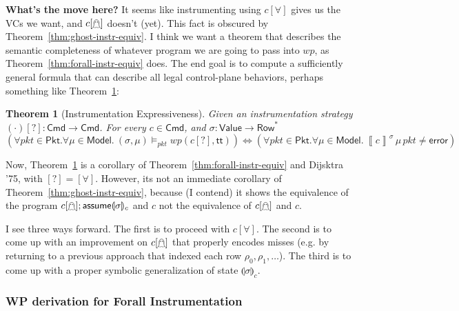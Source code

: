 \documentclass{article}
\newcommand{\pkt}{\mathit{pkt}}
\newcommand{\error}{\mathsf{error}}
\newcommand{\denote}[1]{\left\llbracket#1\right\rrbracket}
\newcommand{\TRUE}{\mathsf{tt}}
\newcommand{\Value}{\mathsf{Value}}
\newcommand{\Cmd}{\mathsf{Cmd}}
\newcommand{\Pkt}{\mathsf{Pkt}}
\newcommand{\Model}{\mathsf{Model}}
\newcommand{\Row}{\mathsf{Row}}
\newcommand{\assume}{\mathop{\mathsf{assume}}}
\newcommand{\WP}{\textit{wp}}
\newcommand{\satisfy}[3]{({#1,#3}) \models_{#2}}
\newcommand{\state}[1]{\llparenthesis#1\rrparenthesis}
\newcommand{\instr}{[\forall]}
\newcommand{\ginstr}{[\mathghost]}
\newtheorem{theorem}{Theorem}
\begin{document}
\textbf{What's the move here?} It seems like instrumenting using $c\instr$ gives
us the VCs we want, and $c\ginstr$ doesn't (yet). This fact is obscured by
Theorem~\ref{thm:ghost-instr-equiv}. I think we want a theorem that describes
the semantic completeness of whatever program we are going to pass into $\WP$,
as Theorem~\ref{thm:forall-instr-equiv} does. The end goal is to compute a sufficiently general formula that can describe all legal control-plane behaviors, perhaps something like Theorem~\ref{thm:instr-expressiveness}:

\begin{theorem}[Instrumentation Expressiveness]
  \label{thm:instr-expressiveness}
  Given an instrumentation strategy $(\cdot)[?] : \Cmd \to \Cmd$.
  For every $c \in \Cmd$, and $\sigma : \Value \to \Row^*$
  \[(\forall \pkt \in \Pkt. \forall \mu \in \Model.~\satisfy\sigma\pkt\mu \WP(c[?], \TRUE)) \iff (\forall \pkt \in \Pkt.\forall \mu \in \Model.~\denote{c}^\sigma\,\mu\,\pkt \neq \error)\]
\end{theorem}

Now, Theorem~\ref{thm:instr-expressiveness} is a corollary of
Theorem~\ref{thm:forall-instr-equiv} and Dijsktra '75, with $[?] = \instr$.
However, its not an immediate corollary of Theorem~\ref{thm:ghost-instr-equiv},
because (I contend) it shows the equivalence of the program
$c\ginstr;\assume\state\sigma_c$ and $c$ not the equivalence of $c\ginstr$ and
$c$.

I see three ways forward. The first is to proceed with $c\instr$. The second is
to come up with an improvement on $c\ginstr$ that properly encodes misses (e.g.
by returning to a previous approach that indexed each row $\rho_0, \rho_1,
\ldots$). The third is to come up with a proper symbolic generalization of state
$\state\sigma_c$.


\subsubsection{WP derivation for Forall Instrumentation}
\label{sec:example-forall-wp-derivation}
\end{document}
